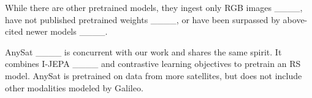 While there are other pretrained models, they ingest only RGB images ____, have not published pretrained weights ____, or have been surpassed by above-cited newer models ____. 

AnySat ____ is concurrent with our work and shares the same spirit.
It combines I-JEPA ____ and contrastive learning objectives to pretrain an RS model.
AnySat is pretrained on data from more satellites, but does not include other modalities modeled by Galileo.